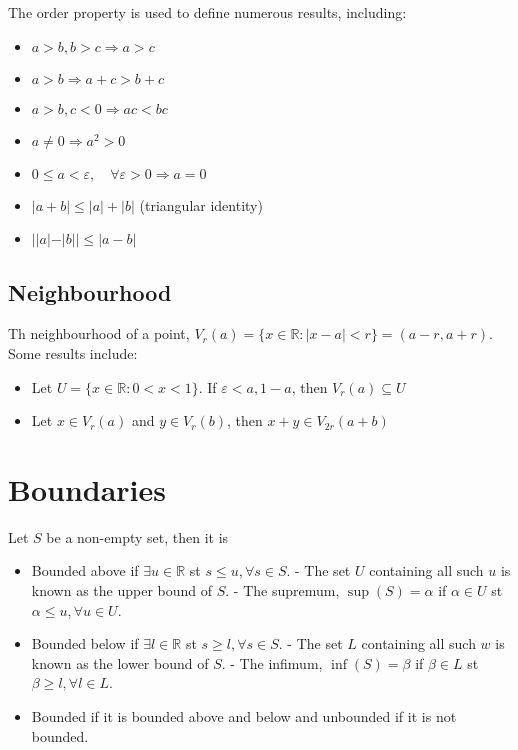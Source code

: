 \documentclass{article}
\begin{document}
The order property is used to define numerous results, including:
\begin{itemize}
	\item $a>b, b>c \Rightarrow a>c$
	\item $a>b \Rightarrow a+c>b+c$
	\item $a>b, c<0 \Rightarrow ac < bc$
	\item $a \not= 0 \Rightarrow a^2 > 0$
	\item $0 \leq a < \varepsilon, \quad \forall \varepsilon > 0 \Rightarrow a = 0$
	\item $|a+b| \leq |a|+|b|$ (triangular identity)
	\item $||a|-|b|| \leq |a-b|$
\end{itemize}

\subsection{Neighbourhood}

Th neighbourhood of a point, $V_r(a) = \{x \in \mathbb{R}: |x-a| < r\} = (a-r, a+r)$. Some results include:
\begin{itemize}
	\item Let $U = \{x\in\mathbb{R}: 0 < x < 1\}$. If $\varepsilon < a, 1-a$, then $V_r(a) \subseteq U$
	\item Let $x \in V_r(a)$ and $y \in V_r(b)$, then $x+y \in V_{2r}(a+b)$
\end{itemize}

\section{Boundaries}

Let $S$ be a non-empty set, then it is
\begin{itemize}
	\item Bounded above if $\exists u \in \mathbb{R}$ st $s \leq u, \forall s \in S$. 
		\subitem - The set $U$ containing all such $u$ is known as the upper bound of $S$.
		\subitem - The supremum, $\sup(S) = \alpha$ if $\alpha \in U$ st $\alpha \leq u, \forall u \in U$.
	\item Bounded below if $\exists l \in \mathbb{R}$ st $s \geq l, \forall s \in S$.
		\subitem - The set $L$ containing all such $w$ is known as the lower bound of $S$.
		\subitem - The infimum, $\inf(S) = \beta$ if $\beta \in L$ st $\beta \geq l, \forall l \in L$.
	\item Bounded if it is bounded above and below and unbounded if it is not bounded.
\end{itemize}
\end{document}
